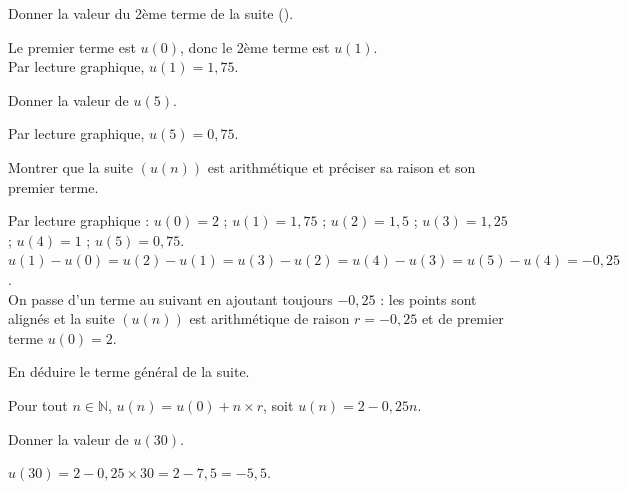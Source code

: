 \documentclass[11pt,a4paper]{article}  %
\begin{document}
\begin{enumMet}
	\item Donner la valeur du 2ème terme de la suite (\danger).
	\par
	\begin{corrBox}
		Le premier terme est $u(0)$, donc le 2ème terme est $u(1)$.\\
		Par lecture graphique, $u(1)=1,75$.
	\end{corrBox}

	\item Donner la valeur de $u(5)$.
	\par
	\begin{corrBox}
		Par lecture graphique, $u(5)=0,75$.
	\end{corrBox}

	\item Montrer que la suite $\left(u(n)\right)$ est arithmétique et préciser sa raison et son premier terme.
	\par
	\begin{corrBox}
		Par lecture graphique : $u(0)=2$ ; $u(1)=1,75$ ; $u(2)=1,5$ ; $u(3)=1,25$ ; $u(4)=1$ ; $u(5)=0,75$.\\
		$u(1)-u(0)=u(2)-u(1)=u(3)-u(2)=u(4)-u(3)=u(5)-u(4)=-0,25$.\\
		On passe d'un terme au suivant en ajoutant toujours $-0,25$ : les points sont alignés et la suite $\left(u(n)\right)$ est arithmétique de raison $r=-0,25$ et de premier terme $u(0)=2$.
	\end{corrBox}

	\item En déduire le terme général de la suite.
	\par
	\begin{corrBox}
		Pour tout $n\in\mathbb{N}$, $u(n)=u(0)+n\times r$, soit $u(n)=2-0,25n$.
	\end{corrBox}

	\item {} Donner la valeur de $u(30)$.
	\par
	\begin{corrBox}
		$u(30)=2-0,25\times 30=2-7,5=-5,5$.
	\end{corrBox}
\end{enumMet}
\end{document}
